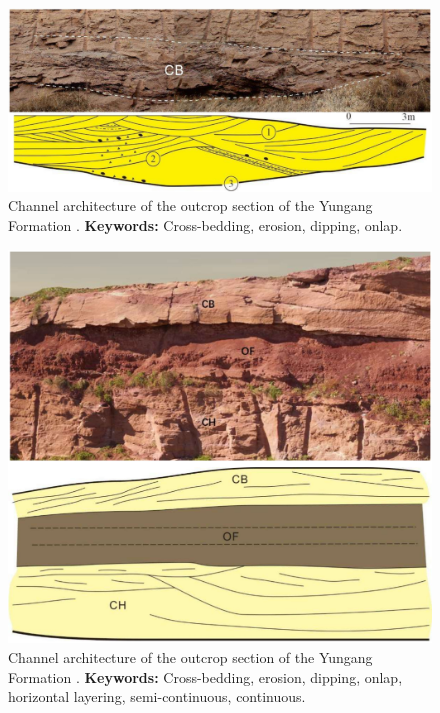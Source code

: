 \begin{figure}[h!]
    \centering
    \includegraphics[width=0.75\linewidth]{Figures/0.4Field/Guo2022_3.png}
    \caption[Channel architecture of the outcrop section of the Yungang Formation (2)]{Channel architecture of the outcrop section of the Yungang Formation \citep{Guo2022}. \textbf{Keywords:} Cross-bedding, erosion, dipping, onlap.}
    \label{fig:Guo2022-3}
\end{figure}
\begin{figure}[h!]
    \centering
    \includegraphics[width=0.75\linewidth]{Figures/0.4Field/Guo2022_4.png}
    \caption[Channel architecture of the outcrop section of the Yungang Formation (3)]{Channel architecture of the outcrop section of the Yungang Formation \citep{Guo2022}. \textbf{Keywords:} Cross-bedding, erosion, dipping, onlap, horizontal layering, semi-continuous, continuous.}
    \label{fig:Guo2022-4}
\end{figure}

